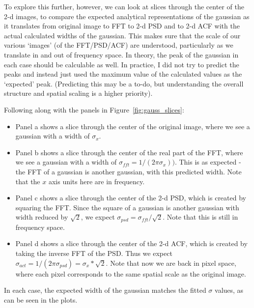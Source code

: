 \documentclass[11pt,preprint]{aastex}
\begin{document}
To explore this further, however, we can look at slices through the center of the 2-d images, to compare the expected analytical representations of the gaussian as it translates from original image to FFT to 2-d PSD and to 2-d ACF with the actual calculated widths of the gaussian. This makes sure that the scale of our various `images' (of the FFT/PSD/ACF) are understood, particularly as we translate in and out of frequency space. In theory, the peak of the gaussian in each case should be calculable as well. In practice, I did not try to predict the peaks and instead just used the maximum value of the calculated values as the `expected' peak. (Predicting this may be a to-do, but understanding the overall structure and spatial scaling is a higher priority). 

Following along with the panels in Figure~\ref{fig:gauss_slices}: 
\begin{itemize}
\item{Panel a shows a slice through the center of the original image, where we see a gaussian with a width of $\sigma_{x}$. }
\item{Panel b shows a slice through the center of the real part of the FFT, where we see a gaussian with a width of $\sigma_{fft} = 1 / (2 \pi \sigma_{x}))$. This is as expected - the FFT of a gaussian is another gaussian, with this predicted width. Note that the $x$ axis units here are in frequency.}
\item{Panel c shows a slice through the center of the 2-d PSD, which is created by squaring the FFT. Since the square of a gaussian is another gaussian with width reduced by $\sqrt 2$, we expect $\sigma_{psd} = \sigma_{fft} / \sqrt 2$. Note that this is still in frequency space. }
\item{Panel d shows a slice through the center of the 2-d ACF, which is created by taking the inverse FFT of the PSD. Thus we expect $\sigma_{act} = 1 / (2 \pi \sigma_{psd}) = \sigma_{x} * \sqrt 2$. Note that now we are back in pixel space, where each pixel corresponds to the same spatial scale as the original image.}
\end{itemize}
In each case, the expected width of the gaussian matches the fitted $\sigma$ values, as can be seen in the plots. 
\end{document}
